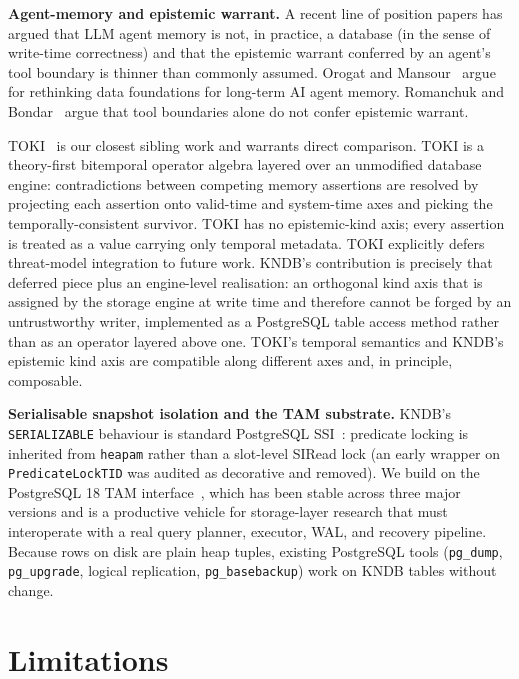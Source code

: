 \documentclass[sigconf, nonacm]{acmart}
\begin{document}
\textbf{Agent-memory and epistemic warrant.} A recent line of position papers has argued that LLM agent memory is not, in practice, a database (in the sense of write-time correctness) and that the epistemic warrant conferred by an agent's tool boundary is thinner than commonly assumed. Orogat and Mansour~\cite{orogat2026agentmemory} argue for rethinking data foundations for long-term AI agent memory. Romanchuk and Bondar~\cite{romanchuk2026laundering} argue that tool boundaries alone do not confer epistemic warrant.

TOKI~\cite{wang2026toki} is our closest sibling work and warrants direct comparison. TOKI is a theory-first bitemporal operator algebra layered over an unmodified database engine: contradictions between competing memory assertions are resolved by projecting each assertion onto valid-time and system-time axes and picking the temporally-consistent survivor. TOKI has no epistemic-kind axis; every assertion is treated as a value carrying only temporal metadata. TOKI explicitly defers threat-model integration to future work. KNDB's contribution is precisely that deferred piece plus an engine-level realisation: an orthogonal kind axis that is assigned by the storage engine at write time and therefore cannot be forged by an untrustworthy writer, implemented as a PostgreSQL table access method rather than as an operator layered above one. TOKI's temporal semantics and KNDB's epistemic kind axis are compatible along different axes and, in principle, composable.

\textbf{Serialisable snapshot isolation and the TAM substrate.} KNDB's \texttt{SERIALIZABLE} behaviour is standard PostgreSQL SSI~\cite{ports2012ssi}: predicate locking is inherited from \texttt{heapam} rather than a slot-level SIRead lock (an early wrapper on \texttt{PredicateLockTID} was audited as decorative and removed). We build on the PostgreSQL 18 TAM interface~\cite{postgres18tam}, which has been stable across three major versions and is a productive vehicle for storage-layer research that must interoperate with a real query planner, executor, WAL, and recovery pipeline. Because rows on disk are plain heap tuples, existing PostgreSQL tools (\texttt{pg\_dump}, \texttt{pg\_upgrade}, logical replication, \texttt{pg\_basebackup}) work on KNDB tables without change.

\section{Limitations}
\label{sec:limitations}
\end{document}
